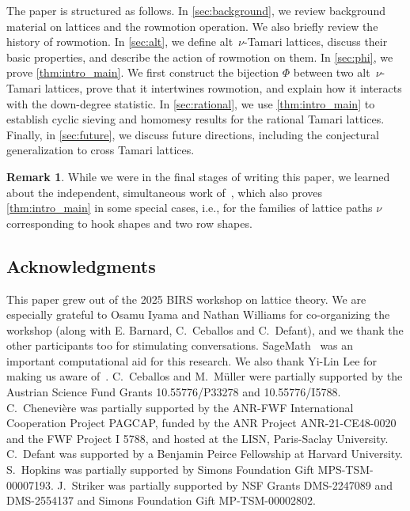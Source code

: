 \documentclass[11pt]{amsart}
\theoremstyle{definition}
\newtheorem{remark}[theorem]{Remark}
\begin{document}
The paper is structured as follows. In \cref{sec:background}, we review background material on lattices and the rowmotion operation. We also briefly review the history of rowmotion. In \cref{sec:alt}, we define alt~$\nu$-Tamari lattices, discuss their basic properties, and describe the action of rowmotion on them. In \cref{sec:phi}, we prove \cref{thm:intro_main}. We first construct the bijection $\Phi$ between two alt~$\nu$-Tamari lattices, prove that it intertwines rowmotion, and explain how it interacts with the down-degree statistic. In \cref{sec:rational}, we use \cref{thm:intro_main} to establish cyclic sieving and homomesy results for the rational Tamari lattices. Finally, in \cref{sec:future}, we discuss future directions, including the conjectural generalization to cross Tamari lattices.

\begin{remark}
While we were in the final stages of writing this paper, we learned about the independent, simultaneous work of~\cite{eu2026rowmotion}, which also proves \cref{thm:intro_main} in some special cases, i.e., for the families of lattice paths $\nu$ corresponding to hook shapes and two row shapes.
\end{remark}

\subsection*{Acknowledgments}

This paper grew out of the 2025 BIRS workshop on lattice theory. We are especially grateful to Osamu Iyama and Nathan Williams for co-organizing the workshop (along with E. Barnard, C.~Ceballos and C.~Defant), and we thank the other participants too for stimulating conversations. SageMath~\cite{Sage} was an important computational aid for this research. We also thank Yi-Lin Lee for making us aware of~\cite{eu2026rowmotion}. C.~Ceballos and M.~M\"{u}ller were partially supported by the Austrian Science Fund Grants 10.55776/P33278 and 10.55776/I5788. C.~Chenevi\`{e}re was partially supported by the ANR-FWF International Cooperation Project PAGCAP, funded by the ANR Project ANR-21-CE48-0020 and the FWF Project I 5788, and hosted at the LISN, Paris-Saclay University. C.~Defant was supported by a Benjamin Peirce Fellowship at Harvard University. S.~Hopkins was partially supported by Simons Foundation Gift MPS-TSM-00007193. J.~Striker was partially supported by NSF Grants DMS-2247089 and DMS-2554137 and Simons Foundation Gift MP-TSM-00002802.
\end{document}
